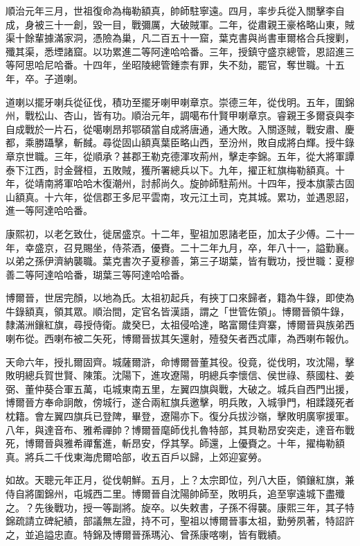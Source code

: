 \begin{pinyinscope}
順治元年三月，世祖復命為梅勒額真，帥師駐寧遠。四月，率步兵從入關擊李自成，身被三十一創，毀一目，戰彌厲，大破賊軍。二年，從肅親王豪格略山東，賊渠十餘輩據滿家洞，憑險為巢，凡二百五十一窟，葉克書與尚書車爾格合兵搜剿，殲其渠，悉堙諸窟。以功累進二等阿達哈哈番。三年，授鎮守盛京總管，恩詔進三等阿思哈尼哈番。十四年，坐昭陵總管鍾柰有罪，失不劾，罷官，奪世職。十五年，卒。子道喇。

道喇以擺牙喇兵從征伐，積功至擺牙喇甲喇章京。崇德三年，從伐明。五年，圍錦州，戰松山、杏山，皆有功。順治元年，調噶布什賢甲喇章京。睿親王多爾袞與李自成戰於一片石，從噶喇昂邦鄂碩當自成將唐通，通大敗。入關逐賊，戰安肅、慶都，乘勝躡擊，斬馘。尋從固山額真葉臣略山西，至汾州，敗自成將白輝。授牛錄章京世職。三年，從順承？甚郡王勒克德渾攻荊州，擊走李錦。五年，從大將軍譚泰下江西，討金聲桓，五敗賊，獲所署總兵以下。九年，擢正紅旗梅勒額真。十年，從靖南將軍哈哈木復潮州，討郝尚久。旋帥師駐荊州。十四年，授本旗蒙古固山額真。十六年，從信郡王多尼平雲南，攻元江土司，克其城。累功，並遇恩詔，進一等阿達哈哈番。

康熙初，以老乞致仕，徙居盛京。十二年，聖祖加恩諸老臣，加太子少傅。二十一年，幸盛京，召見賜坐，侍茶酒，優賚。二十二年九月，卒，年八十一，謚勤襄。以弟之孫伊濟納襲職。葉克書次子夏穆善，第三子瑚葉，皆有戰功，授世職：夏穆善二等阿達哈哈番，瑚葉三等阿達哈哈番。

博爾晉，世居完顏，以地為氏。太祖初起兵，有挾丁口來歸者，籍為牛錄，即使為牛錄額真，領其眾。順治間，定官名皆漢語，謂之「世管佐領」。博爾晉領牛錄，隸滿洲鑲紅旗，尋授侍衛。歲癸巳，太祖侵哈達，略富爾佳齊寨，博爾晉與族弟西喇布從。西喇布被二矢死，博爾晉拔其矢還射，殪發矢者西忒庫，為西喇布報仇。

天命六年，授扎爾固齊。城薩爾滸，命博爾晉董其役。役竟，從伐明，攻沈陽，擊敗明總兵賀世賢、陳策。沈陽下，進攻遼陽，明總兵李懷信、侯世祿、蔡國柱、姜弼、董仲葵合軍五萬，屯城東南五里，左翼四旗與戰，大破之。城兵自西門出援，博爾晉方奉命詗敵，傍城行，遂合兩紅旗兵邀擊，明兵敗，入城爭門，相蹂踐死者枕籍。會左翼四旗兵已登陴，畢登，遼陽亦下。復分兵拔沙嶺，擊敗明廣寧援軍。八年，與達音布、雅希禪帥？博爾晉麾師伐扎魯特部，其貝勒昂安突走，達音布戰死，博爾晉與雅希禪奮進，斬昂安，俘其孥。師還，上優賚之。十年，擢梅勒額真。將兵二千伐東海虎爾哈部，收五百戶以歸，上郊迎宴勞。

如故。天聰元年正月，從伐朝鮮。五月，上？太宗即位，列八大臣，領鑲紅旗，兼侍自將圍錦州，屯城西二里。博爾晉自沈陽帥師至，敗明兵，追至寧遠城下盡殲之。？先後戰功，授一等副將。旋卒。以失敕書，子孫不得襲。康熙三年，其子特錦疏請立碑紀績，部議無左證，持不可，聖祖以博爾晉事太祖，勤勞夙著，特詔許之，並追謚忠直。特錦及博爾晉孫瑪沁、曾孫康喀喇，皆有戰績。


\end{pinyinscope}
